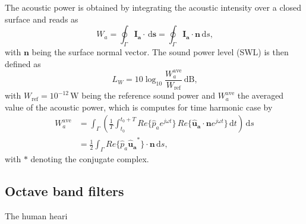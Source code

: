 The acoustic power is obtained by integrating the acoustic intensity over a closed surface and reads as
\begin{equation}
	W_a = \oint_{\Gamma} \boldsymbol{I_a}\cdot\,\text{d}\boldsymbol{s} = \oint_{\Gamma} \boldsymbol{I_a}\cdot\boldsymbol{n}\,\text{d}s \text{,}
\end{equation}
with $\boldsymbol{n}$ being the surface normal vector. The sound power level (SWL) is then defined as
\begin{equation}
	L_W = 10\log_{10}\frac{W_a^{\text{ave}}}{W_\text{ref}}\,\text{dB}\text{,}
\end{equation}
with $W_\text{ref} = 10^{-12}\,\text{W}$ being the reference sound power and $W_a^{\text{ave}}$ the averaged value of the acoustic power, which is computes for time harmonic case by
\begin{align}
	W_a^{\text{ave}} &= \int_{\Gamma}\left(\frac{1}{T} \int_{t_0}^{t_0 + T} Re\lbrace\hat{p}_a e^{j\omega t}\rbrace\,Re\lbrace\boldsymbol{\hat{u}_a} \cdot \boldsymbol{n} e^{j\omega t}\rbrace \, \text{d}t  \right)\,\text{d}s \\
	&= \frac{1}{2} \int_{\Gamma} Re\lbrace\hat{p}_a \boldsymbol{\hat{u}_a}^*\rbrace \cdot \boldsymbol{n}\,\text{d}s \text{,}
\end{align}
with $*$ denoting the conjugate complex.

\newpage
\subsection{Octave band filters}

The human heari


